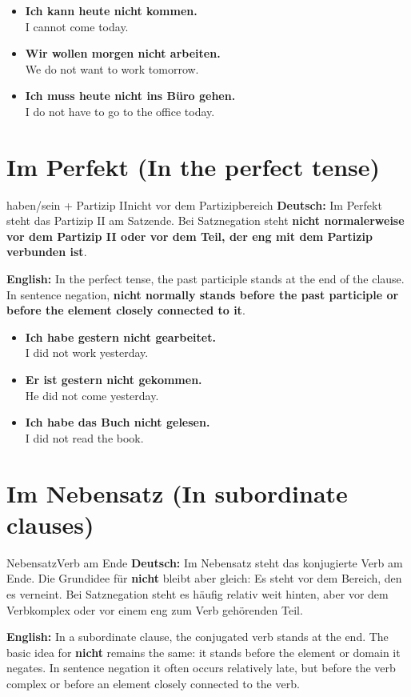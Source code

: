 \documentclass[a4paper,11pt]{article}
\newcommand{\GermanText}[1]{\textbf{Deutsch: }#1\par}
\newcommand{\EnglishText}[1]{{\small\color{SoftGray}\textbf{English: }#1\par}}
\newcommand{\ExampleItem}[2]{\item \textbf{#1}\\{\small\color{SoftGray}#2}}
\begin{document}
\begin{exbox}
\begin{itemize}
\ExampleItem{Ich kann heute \textbf{nicht kommen}.}{I cannot come today.}
\ExampleItem{Wir wollen morgen \textbf{nicht arbeiten}.}{We do not want to work tomorrow.}
\ExampleItem{Ich muss heute \textbf{nicht ins Büro gehen}.}{I do not have to go to the office today.}
\end{itemize}
\end{exbox}

\section{Im Perfekt \textnormal{(In the perfect tense)}}

\begin{grammarentry}{haben/sein + Partizip II}{nicht vor dem Partizipbereich}
\GermanText{Im Perfekt steht das Partizip II am Satzende. Bei Satznegation steht \textbf{nicht normalerweise vor dem Partizip II oder vor dem Teil, der eng mit dem Partizip verbunden ist}.}
\EnglishText{In the perfect tense, the past participle stands at the end of the clause. In sentence negation, \textbf{nicht normally stands before the past participle or before the element closely connected to it}.}
\end{grammarentry}

\begin{exbox}
\begin{itemize}
\ExampleItem{Ich habe gestern \textbf{nicht gearbeitet}.}{I did not work yesterday.}
\ExampleItem{Er ist gestern \textbf{nicht gekommen}.}{He did not come yesterday.}
\ExampleItem{Ich habe das Buch \textbf{nicht gelesen}.}{I did not read the book.}
\end{itemize}
\end{exbox}

\section{Im Nebensatz \textnormal{(In subordinate clauses)}}

\begin{grammarentry}{Nebensatz}{Verb am Ende}
\GermanText{Im Nebensatz steht das konjugierte Verb am Ende. Die Grundidee für \textbf{nicht} bleibt aber gleich: Es steht vor dem Bereich, den es verneint. Bei Satznegation steht es häufig relativ weit hinten, aber vor dem Verbkomplex oder vor einem eng zum Verb gehörenden Teil.}
\EnglishText{In a subordinate clause, the conjugated verb stands at the end. The basic idea for \textbf{nicht} remains the same: it stands before the element or domain it negates. In sentence negation it often occurs relatively late, but before the verb complex or before an element closely connected to the verb.}
\end{grammarentry}
\end{document}
